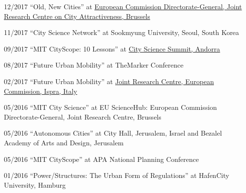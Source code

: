 \begin{tablist}
    \item[12/2017] \tab \enquote{Old, New Cities} at
    \href{https://www.youtube.com/watch?v=AW-ljDEleLw}{European Commission Directorate-General, Joint Research Centre on City Attractiveness, Brussels}

    \item[11/2017] \tab \enquote{City Science Network} at
    {Sookmyung University, Seoul, South Korea}

    \item[09/2017] \tab \enquote{MIT CityScope: 10 Lessons} at
    \href{https://www.youtube.com/watch?v=bRNbap13I5w}{City Science Summit, Andorra}

    \item[08/2017] \tab \enquote{Future Urban Mobility} at
    {TheMarker Conference}

    \item[02/2017] \tab \enquote{Future Urban Mobility} at
    \href{https://ec.europa.eu/jrc/en/event/conference/14th-jrc-annual-training-composite-indicators-and-scoreboards}{Joint Research Centre, European Commission, Ispra, Italy}

    \item[05/2016] \tab \enquote{MIT City Science} at
    {EU ScienceHub: European Commission Directorate-General, Joint Research Centre, Brussels}

    \item[05/2016] \tab \enquote{Autonomous Cities} at
    {City Hall, Jerusalem, Israel and Bezalel Academy of Arts and Design, Jerusalem}

    \item[05/2016] \tab \enquote{MIT CityScope} at
    {APA National Planning Conference}

    \item[01/2016] \tab \enquote{Power/Structures: The Urban Form of Regulations} at
    {HafenCity University, Hamburg}

\end{tablist}
